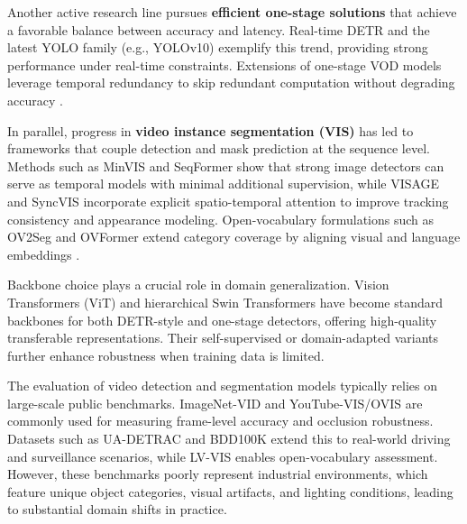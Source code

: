 \documentclass{article}
\begin{document}
Another active research line pursues \textbf{efficient one-stage solutions} that achieve a favorable balance between accuracy and latency. Real-time DETR \citep{RTDETR2023} and the latest YOLO family (e.g., YOLOv10) \citep{YOLOv10_2024} exemplify this trend, providing strong performance under real-time constraints. Extensions of one-stage VOD models leverage temporal redundancy to skip redundant computation without degrading accuracy \citep{EfficientVOD2024}.  

In parallel, progress in \textbf{video instance segmentation (VIS)} has led to frameworks that couple detection and mask prediction at the sequence level. Methods such as MinVIS and SeqFormer \citep{MinVIS2022,SeqFormer2022} show that strong image detectors can serve as temporal models with minimal additional supervision, while VISAGE and SyncVIS \citep{VISAGE2023,SyncVIS2024} incorporate explicit spatio-temporal attention to improve tracking consistency and appearance modeling. Open-vocabulary formulations such as OV2Seg and OVFormer extend category coverage by aligning visual and language embeddings \citep{OV2Seg2023,OVFormer2024,LVVIS2024}.

Backbone choice plays a crucial role in domain generalization. Vision Transformers (ViT) \citep{ViT2020} and hierarchical Swin Transformers \citep{Swin2021} have become standard backbones for both DETR-style and one-stage detectors, offering high-quality transferable representations. Their self-supervised or domain-adapted variants further enhance robustness when training data is limited.

The evaluation of video detection and segmentation models typically relies on large-scale public benchmarks. ImageNet-VID \citep{ImageNetVID2015} and YouTube-VIS/OVIS \citep{YouTubeVIS2019,OVIS2022} are commonly used for measuring frame-level accuracy and occlusion robustness. Datasets such as UA-DETRAC \citep{UADETRAC2015} and BDD100K \citep{BDD100K2020} extend this to real-world driving and surveillance scenarios, while LV-VIS \citep{LVVIS2024} enables open-vocabulary assessment. However, these benchmarks poorly represent industrial environments, which feature unique object categories, visual artifacts, and lighting conditions, leading to substantial domain shifts in practice.
\end{document}
